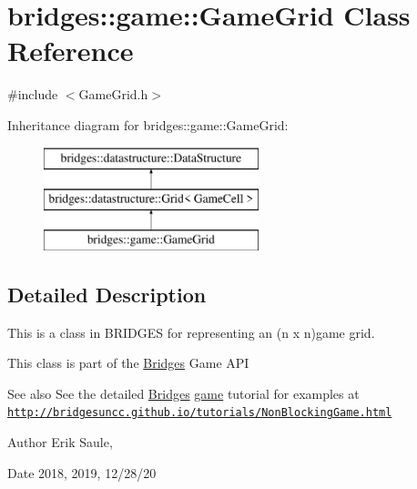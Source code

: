 \hypertarget{classbridges_1_1game_1_1_game_grid}{}\section{bridges\+:\+:game\+:\+:Game\+Grid Class Reference}
\label{classbridges_1_1game_1_1_game_grid}


{\ttfamily \#include $<$Game\+Grid.\+h$>$}

Inheritance diagram for bridges\+:\+:game\+:\+:Game\+Grid\+:\begin{figure}[H]
\begin{center}
\leavevmode
\includegraphics[height=3.000000cm]{classbridges_1_1game_1_1_game_grid}
\end{center}
\end{figure}


\subsection{Detailed Description}
This is a class in B\+R\+I\+D\+G\+ES for representing an (n x n)game grid. 

This class is part of the \hyperlink{classbridges_1_1_bridges}{Bridges} Game A\+PI

\begin{DoxySeeAlso}{See also}
See the detailed \hyperlink{classbridges_1_1_bridges}{Bridges} \hyperlink{namespacebridges_1_1game}{game} tutorial for examples at \href{http://bridgesuncc.github.io/tutorials/NonBlockingGame.html}{\tt http\+://bridgesuncc.\+github.\+io/tutorials/\+Non\+Blocking\+Game.\+html}
\end{DoxySeeAlso}
\begin{DoxyAuthor}{Author}
Erik Saule, 
\end{DoxyAuthor}
\begin{DoxyDate}{Date}
2018, 2019, 12/28/20 
\end{DoxyDate}
